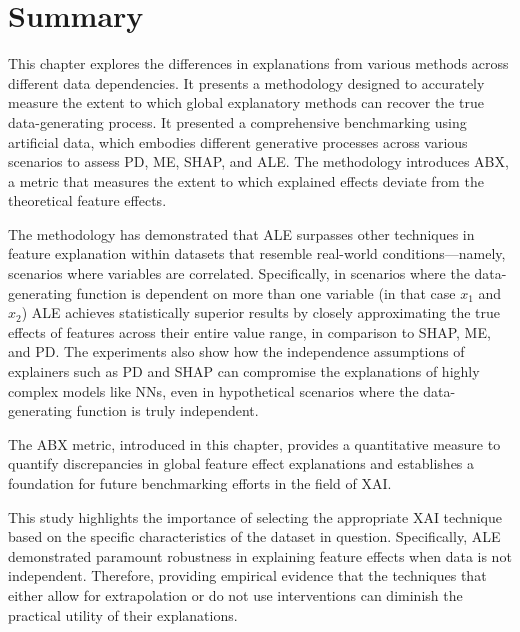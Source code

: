 \section{Summary}

This chapter explores the differences in explanations from various methods across different data dependencies. It presents a methodology designed to accurately measure the extent to which global explanatory methods can recover the true data-generating process. It presented a comprehensive benchmarking using artificial data, which embodies different generative processes across various scenarios to assess PD, ME, SHAP, and ALE. The methodology introduces ABX, a metric that measures the extent to which explained effects deviate from the theoretical feature effects.

The methodology has demonstrated that ALE surpasses other techniques in feature explanation within datasets that resemble real-world conditions—namely, scenarios where variables are correlated. Specifically, in scenarios where the data-generating function is dependent on more than one variable (in that case \(x_1\) and \(x_2\)) ALE achieves statistically superior results by closely approximating the true effects of features across their entire value range, in comparison to SHAP, ME, and PD. The experiments also show how the independence assumptions of explainers such as PD and SHAP can compromise the explanations of highly complex models like NNs, even in hypothetical scenarios where the data-generating function is truly independent.

The ABX metric, introduced in this chapter, provides a quantitative measure to quantify discrepancies in global feature effect explanations and establishes a foundation for future benchmarking efforts in the field of XAI.

This study highlights the importance of selecting the appropriate XAI technique based on the specific characteristics of the dataset in question. Specifically, ALE demonstrated paramount robustness in explaining feature effects when data is not independent. Therefore, providing empirical evidence that the techniques that either allow for extrapolation or do not use interventions can diminish the practical utility of their explanations. 

